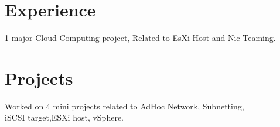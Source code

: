 \documentclass[]{deedy-resume-openfont}
\begin{document}
\begin{minipage}[t]{0.66\textwidth} 


\section{Experience}


{\href{http://tmsindia.co.in/}{}}
\vspace{\topsep} %
\begin{tightemize}
\item 1 major Cloud Computing project, Related to EsXi Host and Nic Teaming.
\end{tightemize}
\sectionsep



\section{Projects}
\begin{tightemize}
\item {}
\end{tightemize}
\begin{tightemize}
\item Worked on 4 mini projects related to AdHoc Network, Subnetting, \\
iSCSI target,ESXi host, vSphere.
\end{tightemize}



\sectionsep





\end{minipage}
\end{document}
